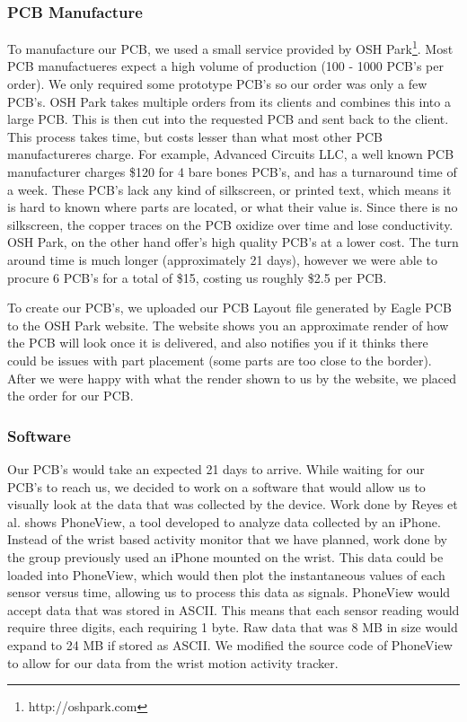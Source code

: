 \subsubsection{PCB Manufacture}
To manufacture our PCB, we used a small service provided by OSH Park\footnote{http://oshpark.com}.
Most PCB manufactueres expect a high volume of production (100 - 1000 PCB's per order).
We only required some prototype PCB's so our order was only a few PCB's.
OSH Park takes multiple orders from its clients and combines this into a large PCB.
This is then cut into the requested PCB and sent back to the client.
This process takes time, but costs lesser than what most other PCB manufactureres charge.
For example,
Advanced Circuits LLC,
a well known PCB manufacturer charges \$120 for 4 bare bones PCB's,
and has a turnaround time of a week.
These PCB's lack any kind of silkscreen,
or printed text,
which means it is hard to known where parts are located,
or what their value is.
Since there is no silkscreen,
the copper traces on the PCB oxidize over time and lose conductivity.
OSH Park,
on the other hand offer's high quality PCB's at a lower cost.
The turn around time is much longer (approximately 21 days),
however we were able to procure 6 PCB's for a total of \$15,
costing us roughly \$2.5 per PCB.

To create our PCB's, we uploaded our PCB Layout file generated by Eagle PCB to the OSH Park website.
The website shows you an approximate render of how the PCB will look once it is delivered,
and also notifies you if it thinks there could be issues with part placement (some parts are too close to the border).
After we were happy with what the render shown to us by the website,
we placed the order for our PCB.

\subsubsection{Software}
\label{Sec:Software}
Our PCB's would take an expected 21 days to arrive. While waiting for our PCB's to reach us,
we decided to work on a software that would allow us to visually look at the data that was collected by the device.
Work done by Reyes et al. \cite{concha2014study} shows PhoneView,
a tool developed to analyze data collected by an iPhone.
Instead of the wrist based activity monitor that we have planned,
work done by the group previously used an iPhone mounted on the wrist.
This data could be loaded into PhoneView,
which would then plot the instantaneous values of each sensor versus time,
allowing us to process this data as signals.
PhoneView would accept data that was stored in ASCII.
This means that each sensor reading would require three digits,
each requiring 1 byte.
Raw data that was 8 MB in size would expand to 24 MB if stored as ASCII.
We modified the source code of PhoneView to allow for our data from the wrist motion activity tracker.

